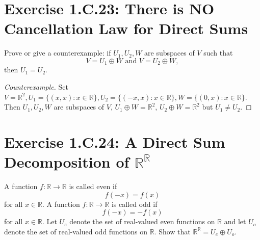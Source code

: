 \section{Exercise 1.C.23: There is NO Cancellation Law for Direct Sums}
Prove or give a counterexample: if $U_1, U_2, W$ are subspaces of $V$ such that\[
V=U_1\oplus W\text{ and }V=U_2\oplus W,
\]then $U_1=U_2$.
\begin{proof}[Counterexample]
Set $V=\mathbb{R}^2, U_1=\{(x,x):x\in\mathbb{R}\}, U_2=\{(-x,x):x\in\mathbb{R}\}, W=\{(0,x):x\in\mathbb{R}\}$. Then $U_1, U_2, W$ are subspaces of $V$, $U_1\oplus W=\mathbb{R}^2$, $U_2\oplus W=\mathbb{R}^2$ but $U_1\ne U_2$.
\end{proof}

\section{Exercise 1.C.24: A Direct Sum Decomposition of $\mathbb{R}^\mathbb{R}$}
A function $f: \mathbb{R}\to\mathbb{R}$ is called even if\[
f(-x)=f(x)
\] for all $x\in\mathbb{R}$. A function $f: \mathbb{R}\to\mathbb{R}$ is called odd if\[
f(-x)=-f(x)
\] for all $x\in\mathbb{R}$. Let $U_e$ denote the set of real-valued even functions on $\mathbb{R}$ and let $U_o$ denote the set of real-valued odd functions on $\mathbb{R}$. Show that $\mathbb{R}^\mathbb{R}=U_e\oplus U_o$.
